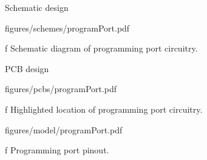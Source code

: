 \secc Schematic design

\midinsert
    \hsize \cinspic figures/schemes/programPort.pdf
    \caption/f Schematic diagram of programming port circuitry.
\endinsert

\secc PCB design

\midinsert
    \hsize \cinspic figures/pcbs/programPort.pdf
    \caption/f Highlighted location of programming port circuitry.
\endinsert

\midinsert
    \hsize \cinspic figures/model/programPort.pdf
    \caption/f Programming port pinout.
\endinsert
